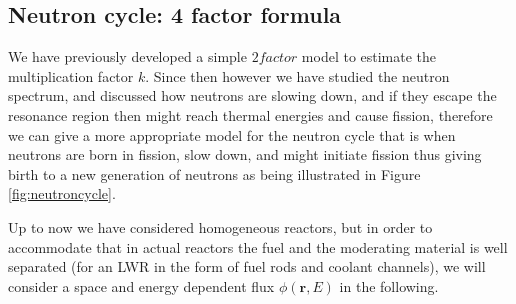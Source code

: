 %
%
%
%
%
%


\subsection{Neutron cycle: 4 factor formula}

We have previously developed a simple $2 factor$ model to estimate the multiplication factor $k$. Since then however we have studied the neutron spectrum, and discussed how neutrons are slowing down, and if they escape the resonance region then might reach thermal energies and cause fission, therefore we can give a more appropriate model for the neutron cycle that is when neutrons are born in fission, slow down, and might initiate fission thus giving birth to a new generation of neutrons as being illustrated in Figure \ref{fig:neutroncycle}.

Up to now we have considered homogeneous reactors, but in order to accommodate that in actual reactors the fuel and the moderating material is well separated (for an LWR in the form of fuel rods and coolant channels), we will consider a space and energy dependent flux $\phi(\mathbf{r},E)$ in the following.

